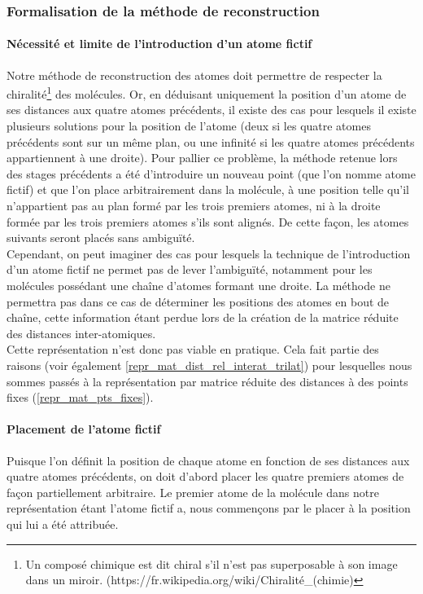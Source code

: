 \subsubsection{Formalisation de la méthode de reconstruction}

\label{repr_mat_dist_rel_interat_form_reconstruct}

\paragraph{Nécessité et limite de l'introduction d'un atome fictif} Notre méthode de reconstruction des atomes doit permettre de respecter la chiralité\footnote{Un composé chimique est dit chiral s'il n'est pas superposable à son image dans un miroir. (https://fr.wikipedia.org/wiki/Chiralité\_(chimie)} des molécules. Or, en déduisant uniquement la position d'un atome de ses distances aux quatre atomes précédents, il existe des cas pour lesquels il existe plusieurs solutions pour la position de l'atome (deux si les quatre atomes précédents sont sur un même plan, ou une infinité si les quatre atomes précédents appartiennent à une droite). Pour pallier ce problème, la méthode retenue lors des stages précédents a été d'introduire un nouveau point (que l'on nomme atome fictif) et que l'on place arbitrairement dans la molécule, à une position telle qu'il n'appartient pas au plan formé par les trois premiers atomes, ni à la droite formée par les trois premiers atomes s'ils sont alignés. De cette façon, les atomes suivants seront placés sans ambiguïté.\\
Cependant, on peut imaginer des cas pour lesquels la technique de l'introduction d'un atome fictif ne permet pas de lever l'ambiguïté, notamment pour les molécules possédant une chaîne d'atomes formant une droite. La méthode ne permettra pas dans ce cas de déterminer les positions des atomes en bout de chaîne, cette information étant perdue lors de la création de la matrice réduite des distances inter-atomiques. \\
Cette représentation n'est donc pas viable en pratique. Cela fait partie des raisons (voir également \ref{repr_mat_dist_rel_interat_trilat}) pour lesquelles nous sommes passés à la représentation par matrice réduite des distances à des points fixes (\ref{repr_mat_pts_fixes}).

\paragraph{Placement de l'atome fictif} Puisque l'on définit la position de chaque atome en fonction de ses distances aux quatre atomes précédents, on doit d'abord placer les quatre premiers atomes de façon partiellement arbitraire. Le premier atome de la molécule dans notre représentation étant l'atome fictif a, nous commençons par le placer à la position qui lui a été attribuée.

